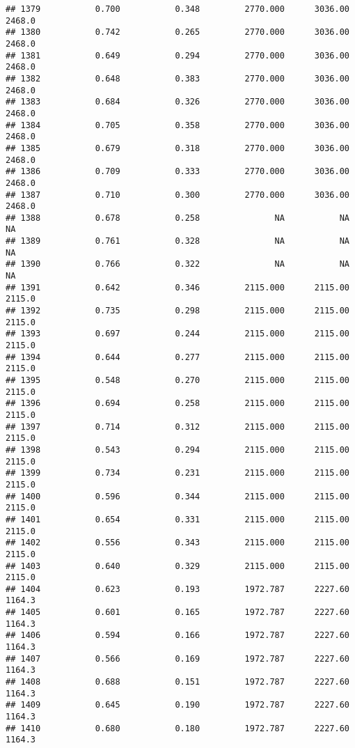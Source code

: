 \documentclass[
]{article}
\begin{document}
\begin{verbatim}
## 1379           0.700           0.348         2770.000      3036.00       2468.0
## 1380           0.742           0.265         2770.000      3036.00       2468.0
## 1381           0.649           0.294         2770.000      3036.00       2468.0
## 1382           0.648           0.383         2770.000      3036.00       2468.0
## 1383           0.684           0.326         2770.000      3036.00       2468.0
## 1384           0.705           0.358         2770.000      3036.00       2468.0
## 1385           0.679           0.318         2770.000      3036.00       2468.0
## 1386           0.709           0.333         2770.000      3036.00       2468.0
## 1387           0.710           0.300         2770.000      3036.00       2468.0
## 1388           0.678           0.258               NA           NA           NA
## 1389           0.761           0.328               NA           NA           NA
## 1390           0.766           0.322               NA           NA           NA
## 1391           0.642           0.346         2115.000      2115.00       2115.0
## 1392           0.735           0.298         2115.000      2115.00       2115.0
## 1393           0.697           0.244         2115.000      2115.00       2115.0
## 1394           0.644           0.277         2115.000      2115.00       2115.0
## 1395           0.548           0.270         2115.000      2115.00       2115.0
## 1396           0.694           0.258         2115.000      2115.00       2115.0
## 1397           0.714           0.312         2115.000      2115.00       2115.0
## 1398           0.543           0.294         2115.000      2115.00       2115.0
## 1399           0.734           0.231         2115.000      2115.00       2115.0
## 1400           0.596           0.344         2115.000      2115.00       2115.0
## 1401           0.654           0.331         2115.000      2115.00       2115.0
## 1402           0.556           0.343         2115.000      2115.00       2115.0
## 1403           0.640           0.329         2115.000      2115.00       2115.0
## 1404           0.623           0.193         1972.787      2227.60       1164.3
## 1405           0.601           0.165         1972.787      2227.60       1164.3
## 1406           0.594           0.166         1972.787      2227.60       1164.3
## 1407           0.566           0.169         1972.787      2227.60       1164.3
## 1408           0.688           0.151         1972.787      2227.60       1164.3
## 1409           0.645           0.190         1972.787      2227.60       1164.3
## 1410           0.680           0.180         1972.787      2227.60       1164.3

\end{verbatim}
\end{document}
